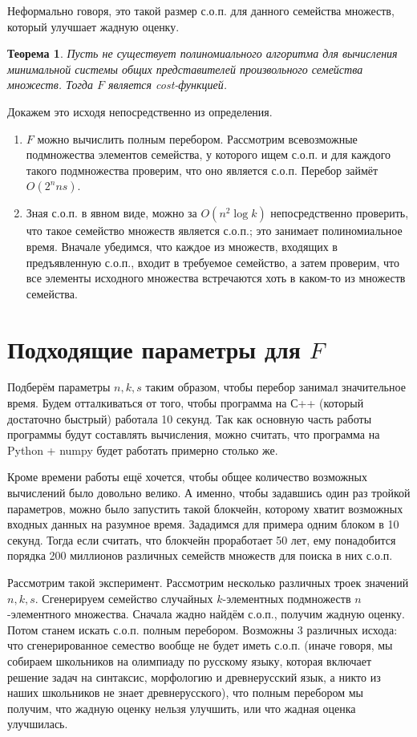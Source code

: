 \documentclass{article}
\newtheorem*{theorem}{Теорема}
\begin{document}
    Неформально говоря, это такой размер с.о.п. для данного семейства множеств, который улучшает жадную оценку.


\begin{theorem}
    Пусть не существует полиномиального алгоритма для вычисления минимальной системы общих представителей произвольного семейства множеств. Тогда $F$ является cost-функцией. 
\end{theorem}

Докажем это исходя непосредственно из определения.
\begin{enumerate}
\item $F$ можно вычислить полным перебором. Рассмотрим всевозможные подмножества элементов семейства, у которого ищем с.о.п. и для каждого такого подмножества проверим, что оно является с.о.п. Перебор займёт $O(2^n ns)$. 
\item Зная с.о.п. в явном виде, можно за $O(n^2 \log k)$ непосредственно проверить, что такое семейство множеств является с.о.п.; это занимает полиномиальное время. Вначале убедимся, что каждое из множеств, входящих в предъявленную с.о.п., входит в требуемое семейство, а затем проверим, что все элементы исходного множества встречаются хоть в каком-то из множеств семейства.
\end{enumerate}

\section{Подходящие параметры для $F$}

    Подберём параметры $n, k, s$ таким образом, чтобы перебор занимал значительное время. Будем отталкиваться от того, чтобы программа на С++ (который достаточно быстрый) работала 10 секунд. Так как основную часть работы программы будут составлять вычисления, можно считать, что программа на Python + numpy будет работать примерно столько же.

    Кроме времени работы ещё хочется, чтобы общее количество возможных вычислений было довольно велико. А именно, чтобы задавшись один раз тройкой параметров, можно было запустить такой блокчейн, которому хватит возможных входных данных на разумное время. Зададимся для примера одним блоком в 10 секунд. Тогда если считать, что блокчейн проработает 50 лет, ему понадобится порядка 200 миллионов различных семейств множеств для поиска в них с.о.п.

    Рассмотрим такой эксперимент. Рассмотрим несколько различных троек значений $n, k, s$. Сгенерируем семейство случайных $k$-элементных подмножеств $n$-элементного множества. Сначала жадно найдём с.о.п., получим жадную оценку. Потом станем искать с.о.п. полным перебором. Возможны 3 различных исхода: что сгенерированное семество вообще не будет иметь с.о.п. (иначе говоря, мы собираем школьников на олимпиаду по русскому языку, которая включает решение задач на синтаксис, морфологию и древнерусский язык, а никто из наших школьников не знает древнерусского), что полным перебором мы получим, что жадную оценку нельзя улучшить, или что жадная оценка улучшилась.
\end{document}
